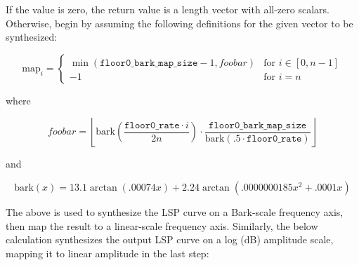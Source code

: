 If the value \varname{[amplitude]} is zero, the return value is a
length \varname{[n]} vector with all-zero scalars.  Otherwise, begin by
assuming the following definitions for the given vector to be
synthesized:

   \begin{displaymath}
     \mathrm{map}_i = \left\{
       \begin{array}{ll}
          \min (
            \mathtt{floor0\_bark\_map\_size} - 1,
            foobar
          ) & \textrm{for } i \in [0,n-1] \\
          -1 & \textrm{for } i = n
        \end{array}
      \right.
    \end{displaymath}

    where

    \begin{displaymath}
    foobar =
      \left\lfloor
        \mathrm{bark}\left(\frac{\mathtt{floor0\_rate} \cdot i}{2n}\right) \cdot \frac{\mathtt{floor0\_bark\_map\_size}} {\mathrm{bark}(.5 \cdot \mathtt{floor0\_rate})}
      \right\rfloor
    \end{displaymath}

    and

    \begin{displaymath}
      \mathrm{bark}(x) = 13.1 \arctan (.00074x) + 2.24 \arctan (.0000000185x^2 + .0001x)
    \end{displaymath}

The above is used to synthesize the LSP curve on a Bark-scale frequency
axis, then map the result to a linear-scale frequency axis.
Similarly, the below calculation synthesizes the output LSP curve \varname{[output]} on a log
(dB) amplitude scale, mapping it to linear amplitude in the last step:

